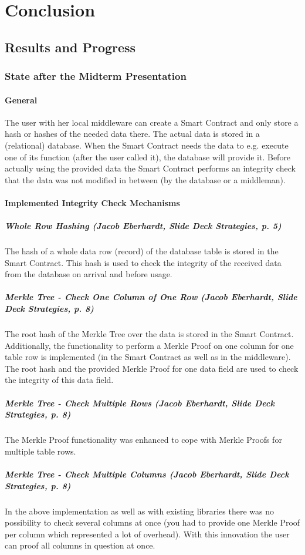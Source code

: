 \section{Conclusion}
\subsection{Results and Progress}
\subsubsection{State after the Midterm Presentation}
\paragraph{General}
The user with her local middleware can create a Smart Contract and only store a hash or hashes of the needed data there. The actual data is stored in a (relational) database. When the Smart Contract needs the data to e.g. execute one of its function (after the user called it), the database will provide it. Before actually using the provided data the Smart Contract performs an integrity check that the data was not modified in between (by the database or a middleman).

\paragraph{Implemented Integrity Check Mechanisms}
\subparagraph{Whole Row Hashing (Jacob Eberhardt, Slide Deck Strategies, p. 5)}
The hash of a whole data row (record) of the database table is stored in the Smart Contract. This hash is used to check the integrity of the received data from the database on arrival and before usage.

\subparagraph{Merkle Tree - Check One Column of One Row (Jacob Eberhardt, Slide Deck Strategies, p. 8)}
The root hash of the Merkle Tree over the data is stored in the Smart Contract. Additionally, the functionality to perform a Merkle Proof on one column for one table row is implemented (in the Smart Contract as well as in the middleware). The root hash and the provided Merkle Proof for one data field are used to check the integrity of this data field.

\subparagraph{Merkle Tree - Check Multiple Rows (Jacob Eberhardt, Slide Deck Strategies, p. 8)}
The Merkle Proof functionality was enhanced to cope with Merkle Proofs for multiple table rows.

\subparagraph{Merkle Tree - Check Multiple Columns (Jacob Eberhardt, Slide Deck Strategies, p. 8)}
In the above implementation as well as with existing libraries there was no possibility to check several columns at once (you had to provide one Merkle Proof per column which represented a lot of overhead). With this innovation the user can proof all columns in question at once.

